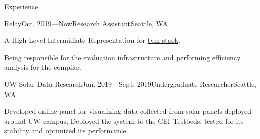 \documentclass{resume}
\begin{document}

	\begin{rSection}{Experience}



		\begin{rSubsection}{Relay}{Oct. 2019---Now}{Research Assistant}{Seattle, WA}
			\item A High-Level Intermidiate Representation for \href{https://tvm.ai/}{tvm stack}.
			\item Being responsible for the evaluation infrastructure and performing efficiency analysis for the compiler.
		\end{rSubsection}
		\vspace{-5pt}


		\begin{rSubsection}{UW Solar Data Research}{Jan. 2019---Sept. 2019}{Undergraduate Researcher}{Seattle, WA}
			\item Developed online panel for visualizing data collected from solar panels deployed around UW campus; Deployed the system to the CEI Testbeds, tested for its stability and optimized its performance.
		\end{rSubsection}
		\vspace{-5pt}


	\end{rSection}
	\vspace{-5pt}
\end{document}
